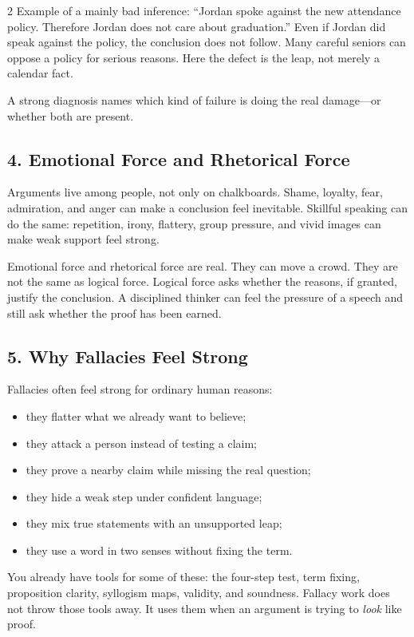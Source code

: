\documentclass[12pt]{article}
\begin{document}
\begin{multicols}{2}
Example of a mainly bad inference: ``Jordan spoke against the new attendance policy. Therefore Jordan does not care about graduation.'' Even if Jordan did speak against the policy, the conclusion does not follow. Many careful seniors can oppose a policy for serious reasons. Here the defect is the leap, not merely a calendar fact.

A strong diagnosis names which kind of failure is doing the real damage---or whether both are present.

\subsection*{4. Emotional Force and Rhetorical Force}
Arguments live among people, not only on chalkboards. Shame, loyalty, fear, admiration, and anger can make a conclusion feel inevitable. Skillful speaking can do the same: repetition, irony, flattery, group pressure, and vivid images can make weak support feel strong.

Emotional force and rhetorical force are real. They can move a crowd. They are not the same as logical force. Logical force asks whether the reasons, if granted, justify the conclusion. A disciplined thinker can feel the pressure of a speech and still ask whether the proof has been earned.

\subsection*{5. Why Fallacies Feel Strong}
Fallacies often feel strong for ordinary human reasons:

\begin{itemize}[leftmargin=*,itemsep=0.12em]
\item they flatter what we already want to believe;
\item they attack a person instead of testing a claim;
\item they prove a nearby claim while missing the real question;
\item they hide a weak step under confident language;
\item they mix true statements with an unsupported leap;
\item they use a word in two senses without fixing the term.
\end{itemize}

You already have tools for some of these: the four-step test, term fixing, proposition clarity, syllogism maps, validity, and soundness. Fallacy work does not throw those tools away. It uses them when an argument is trying to \textit{look} like proof.


\end{multicols}
\end{document}
